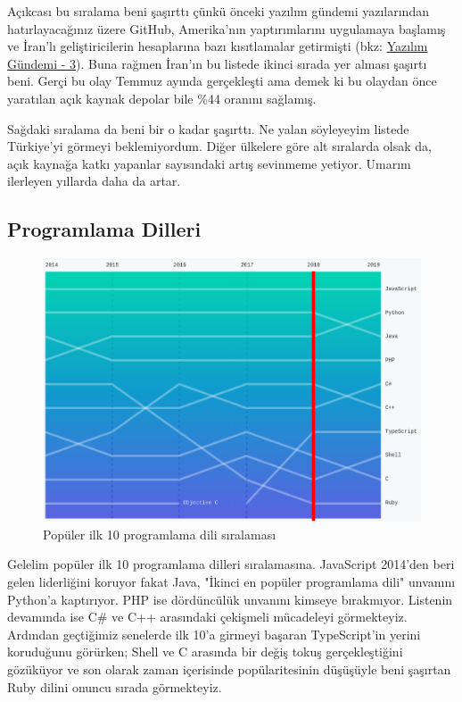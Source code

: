 \documentclass[11pt]{article}
\begin{document}
Açıkcası bu sıralama beni şaşırttı çünkü önceki yazılım gündemi yazılarından
hatırlayacağınız üzere GitHub, Amerika'nın yaptırımlarını uygulamaya başlamış
ve İran'lı geliştiricilerin hesaplarına bazı kısıtlamalar getirmişti (bkz:
\href{../03/yazilim-gundemi-03.pdf}{Yazılım Gündemi - 3}). Buna rağmen İran'ın bu listede ikinci sırada yer alması
şaşırtı beni. Gerçi bu olay Temmuz ayında gerçekleşti ama demek ki bu olaydan
önce yaratılan açık kaynak depolar bile \%44 oranını sağlamış.

Sağdaki sıralama da beni bir o kadar şaşırttı. Ne yalan söyleyeyim listede
Türkiye'yi görmeyi beklemiyordum. Diğer ülkelere göre alt sıralarda olsak da,
açık kaynağa katkı yapanlar sayısındaki artış sevinmeme yetiyor. Umarım
ilerleyen yıllarda daha da artar.
\subsection{Programlama Dilleri}
\label{sec:org2b93b05}
\begin{figure}[htbp]
\centering
\includegraphics[width=.9\linewidth]{gorseller/github-populer-diller.png}
\caption{Popüler ilk 10 programlama dili sıralaması}
\end{figure}

Gelelim popüler ilk 10 programlama dilleri sıralamasına. JavaScript 2014'den
beri gelen liderliğini koruyor fakat Java, "İkinci en popüler programlama
dili" unvanını Python'a kaptırıyor. PHP ise dördüncülük unvanını kimseye
bırakmıyor. Listenin devamında ise C\# ve C++ arasındaki çekişmeli mücadeleyi
görmekteyiz. Ardından geçtiğimiz senelerde ilk 10'a girmeyi başaran
TypeScript'in yerini koruduğunu görürken; Shell ve C arasında bir değiş tokuş
gerçekleştiğini gözüküyor ve son olarak zaman içerisinde popülaritesinin
düşüşüyle beni şaşırtan Ruby dilini onuncu sırada görmekteyiz.
\end{document}
